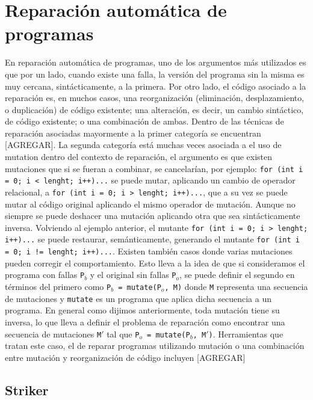 \chapter[Reparaci\'on]{Reparaci\'on autom\'atica de programas}
\label{sec:preliminares.repair}

En reparaci\'on autom\'atica de programas, uno de los argumentos m\'as utilizados es que por un lado, cuando existe una falla, la versi\'on del programa sin la misma es muy cercana, sint\'acticamente, a la primera. Por otro lado, el c\'odigo asociado a la reparaci\'on es, en muchos casos, una reorganizaci\'on (eliminaci\'on, desplazamiento, o duplicaci\'on) de c\'odigo existente; una alteraci\'on, es decir, un cambio sint\'actico, de c\'odigo existente; o una combinaci\'on de ambas. Dentro de las t\'ecnicas de reparaci\'on asociadas mayormente a la primer categor\'ia se encuentran [AGREGAR]. La segunda categor\'ia est\'a muchas veces asociada a el uso de mutation dentro del contexto de reparaci\'on, el argumento es que existen mutaciones que si se fueran a combinar, se cancelar\'ian, por ejemplo:
\lstinline|for (int i = 0; i < lenght; i++)...| se puede mutar, aplicando un cambio de operador relacional, a \lstinline|for (int i = 0; i > lenght; i++)...|, que a su vez se puede mutar al c\'odigo original aplicando el mismo operador de mutaci\'on. Aunque no siempre se puede deshacer una mutaci\'on aplicando otra que sea sint\'acticamente inversa. Volviendo al ejemplo anterior, el mutante \lstinline|for (int i = 0; i > lenght; i++)...| se puede restaurar, sem\'anticamente, generando el mutante \lstinline|for (int i = 0; i != lenght; i++)...|. Existen tambi\'en casos donde varias mutaciones pueden corregir el comportamiento. Esto lleva a la idea de que si consideramos el programa con fallas \texttt{P$_b$} y el original sin fallas \texttt{P$_o$}, se puede definir el segundo en t\'erminos del primero como \texttt{P$_b$ = mutate(P$_o$, M)} donde \texttt{M} representa una secuencia de mutaciones y \texttt{mutate} es un programa que aplica dicha secuencia a un programa. En general como dijimos anteriormente, toda mutaci\'on tiene su inversa, lo que lleva a definir el problema de reparaci\'on como encontrar una secuencia de mutaciones \texttt{M$\prime$} tal que \texttt{P$_o$ = mutate(P$_b$, M$\prime$)}. Herramientas que tratan este caso, el de reparar programas utilizando mutaci\'on o una combinaci\'on entre mutaci\'on y reorganizaci\'on de c\'odigo incluyen [AGREGAR]

\section{Striker}
\label{sec:preliminares.repair.striker}
